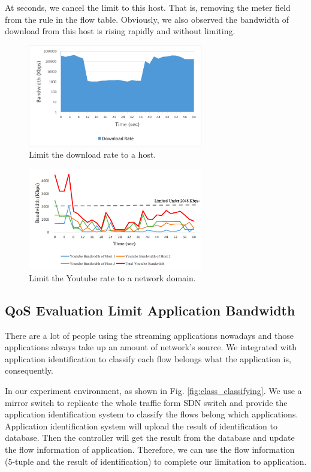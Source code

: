 \documentclass[journal]{IEEEtran}
\begin{document}
At  seconds, we cancel the limit to this host. That is, removing the meter field from the rule in the flow table. Obviously, we also observed the bandwidth of download from this host is rising rapidly and without limiting.

\begin{figure}[!t]
\centering
\includegraphics[width=3in]{./figures/qos_limit_host}
\caption{Limit the download rate to a host.}
\label{fig:qos_limit_host}
\end{figure}

\begin{figure}[!t]
\centering
\includegraphics[width=3in]{./figures/mft_qos_rate_domain_app}
\caption{Limit the Youtube rate to a network domain.}
\label{fig:mft_qos_rate_domain_app}
\end{figure}

\subsection{QoS Evaluation Limit Application Bandwidth}

There are a lot of people using the streaming applications nowadays and those applications always take up an amount of network’s source. We integrated with application identification to classify each flow belongs what the application is, consequently.

In our experiment environment, as shown in Fig. \ref{fig:class_classifying}. We use a mirror switch to replicate the whole traffic form SDN switch and provide the application identification system to classify the flows belong which applications. Application identification system will upload the result of identification to database. Then the controller will get the result from the database and update the flow information of application. Therefore, we can use the flow information (5-tuple and the result of identification) to complete our limitation to application.
\end{document}
